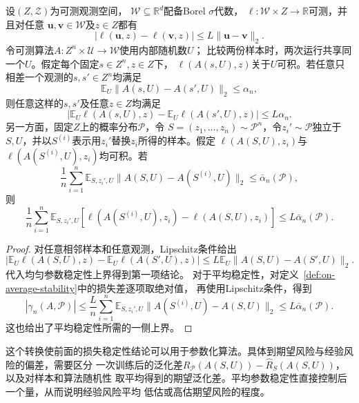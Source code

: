 \begin{theorem}[参数稳定性与损失稳定性]
\label{thm:parameter-to-loss-stability}
设$(Z,\mathcal Z)$为可测观测空间，
$\mathcal W\subseteq\mathbb R^d$配备Borel $\sigma$代数，
$\ell:\mathcal W\times Z\to\mathbb R$可测，并且对任意
$\bm u,\bm v\in\mathcal W$及$z\in Z$都有
\[
 |\ell(\bm u,z)-\ell(\bm v,z)|
 \leq L\|\bm u-\bm v\|_2.
\]
令可测算法$A:Z^n\times\mathcal U\to\mathcal W$使用内部随机数$U$；
比较两份样本时，两次运行共享同一个$U$。假定每个固定$s\in Z^n,z\in Z$下，
$\ell(A(s,U),z)$关于$U$可积。若任意只相差一个观测的$s,s'\in Z^n$均满足
\[
 \mathbb E_U\|A(s,U)-A(s',U)\|_2\leq\alpha_n,
\]
则任意这样的$s,s'$及任意$z\in Z$均满足
\[
 \left|\mathbb E_U\ell(A(s,U),z)-\mathbb E_U\ell(A(s',U),z)\right|
 \leq L\alpha_n.
\]
另一方面，固定$Z$上的概率分布$\mathcal P$，令
$S=(z_1,\ldots,z_n)\sim\mathcal P^n$，令$z_i'\sim\mathcal P$独立于
$S,U$，并以$S^{(i)}$表示用$z_i'$替换$z_i$所得的样本。假定
$\ell(A(S,U),z_i)$与$\ell(A(S^{(i)},U),z_i)$均可积。若
\[
 \frac1n\sum_{i=1}^n\mathbb E_{S,z_i',U}
 \|A(S,U)-A(S^{(i)},U)\|_2
 \leq\bar\alpha_n(\mathcal P),
\]
则
\[
 \frac1n\sum_{i=1}^n\mathbb E_{S,z_i',U}
 [\ell(A(S^{(i)},U),z_i)-\ell(A(S,U),z_i)]
 \leq L\bar\alpha_n(\mathcal P).
\]
\end{theorem}
\begin{proof}
对任意相邻样本和任意观测，Lipschitz条件给出
\[
 \left|\mathbb E_U\ell(A(S,U),z)-\mathbb E_U\ell(A(S',U),z)\right|
 \leq L\mathbb E_U\|A(S,U)-A(S',U)\|_2.
\]
代入均匀参数稳定性上界得到第一项结论。
对于平均稳定性，对定义~\ref{def:on-average-stability}中的损失差逐项取绝对值，
再使用Lipschitz条件，得到
\[
 |\gamma_n(A,\mathcal P)|
 \leq\frac Ln\sum_{i=1}^n\mathbb E_{S,z_i',U}
       \|A(S^{(i)},U)-A(S,U)\|_2
 \leq L\bar\alpha_n(\mathcal P).
\]
这也给出了平均稳定性所需的一侧上界。
\end{proof}

这个转换使前面的损失稳定性结论可以用于参数化算法。具体到期望风险与经验风险的偏差，需要区分
一次训练后的泛化差$R_{\mathcal P}(A(S,U))-\hat R_S(A(S,U))$，以及对样本和算法随机性
取平均得到的期望泛化差。平均参数稳定性直接控制后一个量，从而说明经验风险平均
低估或高估期望风险的程度。

